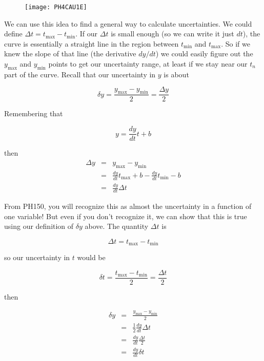 \begin{figure}[h!]
	\centering
    \texttt{[image: PH4CAU1E]}
\end{figure}

We can use this idea to find a general way to calculate uncertainties. We could define $\Delta t=t_{\max }-t_{\min }$. If our $\Delta t$ is small enough (so we can write it just $dt$), the curve is essentially a straight line in the region between $t_{\min }$ and $t_{\max }.$ So if we knew the
slope of that line (the derivative $dy/dt$) we could easily figure out the $y_{\max }$ and $y_{\min }$ points to get our uncertainty range, at least if we stay near our $t_{n}$ part of the curve. Recall that our uncertainty in $y$ is about

\begin{equation*}
	\delta y=\frac{y_{\max }-y_{\min }}{2}=\frac{\Delta y}{2}
\end{equation*}

Remembering that 

\begin{equation*}
	y=\frac{dy}{dt}t+b
\end{equation*}

then 
\begin{eqnarray*}
	\Delta y &=&y_{\max }-y_{\min } \\
			 &=&\frac{dy}{dt}t_{\max }+b-\frac{dy}{dt}t_{\min }-b \\
             &=&\frac{dy}{dt}\Delta t
\end{eqnarray*}

From PH150, you will recognize this as almost the uncertainty in a function of one variable! But even if you don't recognize it, we can show that this is true using our definition of $\delta y$ above. The quantity $\Delta t$ is 

\begin{equation*}
	\Delta t=t_{\max }-t_{\min }
\end{equation*}

so our uncertainty in $t$ would be 

\begin{equation*}
	\delta t=\frac{t_{\max }-t_{\min }}{2}=\frac{\Delta t}{2}
\end{equation*}

then 

\begin{eqnarray*}
	\delta y &=&\frac{y_{\max }-y_{\min }}{2} \\
             &=&\frac{1}{2}\frac{dy}{dt}\Delta t \\
             &=&\frac{dy}{dt}\frac{\Delta t}{2} \\
             &=&\frac{dy}{dt}\delta t
\end{eqnarray*}

